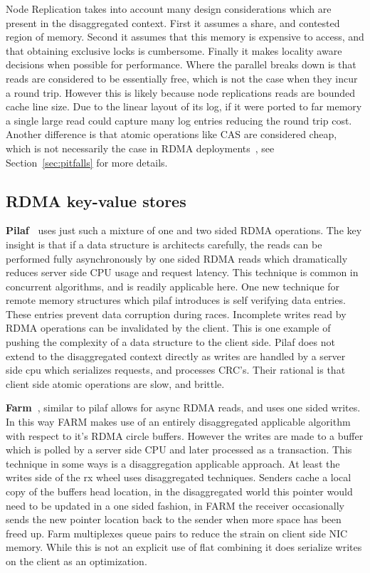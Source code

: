 Node Replication takes into account many design considerations which are present
in the disaggregated context. First it assumes a share, and contested region of
memory. Second it assumes that this memory is expensive to access, and that
obtaining exclusive locks is cumbersome. Finally it makes locality aware
decisions when possible for performance. Where the parallel breaks down is that
reads are considered to be essentially free, which is not the case when they
incur a round trip. However this is likely because node replications reads are
bounded cache line size. Due to the linear layout of its log, if it were ported
to far memory a single large read could capture many log entries reducing the
round trip cost.  Another difference is that atomic operations like CAS are
considered cheap, which is not necessarily the case in RDMA
deployments~\cite{design-guidelines}, see Section~\ref{sec:pitfalls} for more
details. 


\subsection{RDMA key-value stores} 
\textbf{Pilaf~\cite{pilaf}} uses just such a mixture of one and two sided RDMA
operations. The key insight is that if a data structure is architects carefully,
the reads can be performed fully asynchronously by one sided RDMA reads which
dramatically reduces server side CPU usage and request latency. This technique
is common in concurrent algorithms, and is readily applicable here. One new
technique for remote memory structures which pilaf introduces is self verifying
data entries. These entries prevent data corruption during races. Incomplete
writes read by RDMA operations can be invalidated by the client. This is one
example of pushing the complexity of a data structure to the client side. Pilaf
does not extend to the disaggregated context directly as writes are handled by a
server side cpu which serializes requests, and processes CRC's. Their rational
is that client side atomic operations are slow, and brittle. 


\textbf{Farm~\cite{farm}}, similar to pilaf allows for async RDMA reads, and
uses one sided writes. In this way FARM makes use of an entirely disaggregated
applicable algorithm with respect to it's RDMA circle buffers. 
However the writes are made to a buffer which is polled by a server side CPU and
later processed as a transaction. This technique in some ways is a
disaggregation applicable approach. At least the writes side of the rx wheel
uses disaggregated techniques. Senders cache a local copy of the buffers head
location, in the disaggregated world this pointer would need to be updated in a
one sided fashion, in FARM the receiver occasionally sends the new pointer
location back to the sender when more space has been freed up.
Farm multiplexes queue pairs to reduce the strain on client side NIC memory.
While this is not an explicit use of flat combining it does serialize writes on
the client as an optimization.

